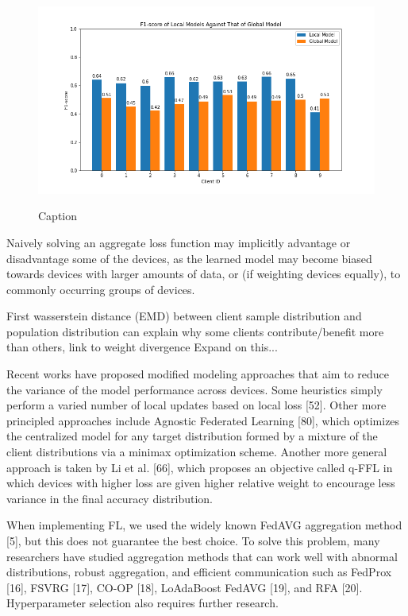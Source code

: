\documentclass[letterpaper]{article} %
\begin{document}
\begin{figure}[h]
{\includegraphics[width=\columnwidth]{noniid-distribution-based-label-imbalance_seed_2performance_of_models_on_client_data_f1score}}
\caption{Caption}
\end{figure}

Naively solving an aggregate loss function may implicitly advantage or disadvantage some of the devices, as the learned model may become biased towards devices with larger amounts of data, or (if weighting devices equally), to commonly occurring groups of devices. 

First wasserstein distance (EMD) between client sample distribution and population distribution can explain why some clients contribute/benefit more than others, link to weight divergence Expand on this...

Recent works have proposed modified modeling approaches that aim to reduce the variance of the model performance across devices. Some heuristics simply perform a varied number of local updates based
on local loss [52]. Other more principled approaches include Agnostic Federated Learning [80], which optimizes the centralized model for any target distribution formed by a mixture of the client distributions via a minimax optimization scheme. Another more general approach is taken by Li et al. [66], which proposes an objective called q-FFL in which devices with higher loss are given higher relative weight to encourage less variance in the final accuracy distribution.

When implementing FL, we used the
widely known FedAVG aggregation method [5], but this does
not guarantee the best choice. To solve this problem, many
researchers have studied aggregation methods that can work
well with abnormal distributions, robust aggregation, and
efficient communication such as FedProx [16], FSVRG [17],
CO-OP [18], LoAdaBoost FedAVG [19], and RFA [20].
Hyperparameter selection also requires further research.
\end{document}

